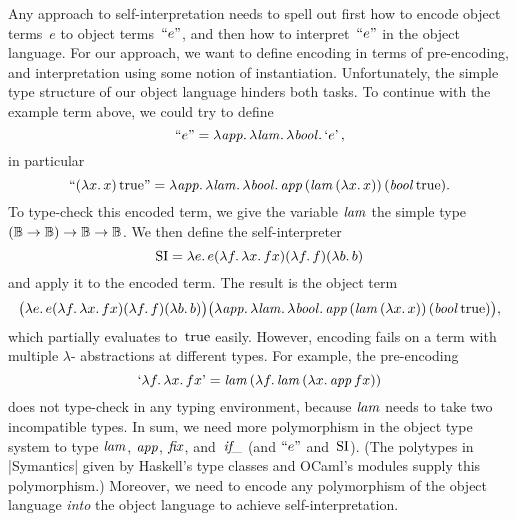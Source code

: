 Any approach to self\hyp interpretation needs to spell out first how to
encode object terms~$e$ to object terms~$\Encode{e}$, and then how to
interpret~$\Encode{e}$ in the object language.  For our approach, we
want to define encoding in terms of pre-encoding, and interpretation
using some notion of instantiation.  Unfortunately, the simple type
structure of our object language hinders both tasks.  To continue with
the example term above, we could try to define
\begin{equation*}
    \Encode{e} =
    \fun{\ident{app}} \fun{\ident{lam}} \fun{\ident{bool}} \encode{e},
\end{equation*}
in particular
\begin{equation*}
    \Encode{(\fun{x}x)\True} =
    \fun{\ident{app}} \fun{\ident{lam}} \fun{\ident{bool}}
    \ident{app} (\ident{lam} (\fun{x} x))\, (\ident{bool} \True).
\end{equation*}
To type-check this encoded term, we give the variable $\ident{lam}$ the
simple type $(\BB\to\BB)\to\BB\to\BB$.
We then define the self\hyp interpreter
\begin{equation*}
    \si = \fun{e} e
    (\fun{f} \fun{x} fx)
    (\fun{f} f)
    (\fun{b} b)
\end{equation*}
and apply it to the encoded term.  The result is the object term
\begin{equation*}
    \bigl(\fun{e} e (\fun{f} \fun{x} fx) (\fun{f} f) (\fun{b} b)\bigr)
    \bigl(
    \fun{\ident{app}} \fun{\ident{lam}} \fun{\ident{bool}}
    \ident{app} (\ident{lam} (\fun{x} x))\, (\ident{bool} \True)
    \bigr),
\end{equation*}
which partially evaluates to~$\True$ easily.
However, encoding fails on a term with multiple $\lambda$\hyp
abstractions at different types.  For example, the pre-encoding
\begin{equation*}
    \encode{\fun{f}\fun{x}fx}
    = \ident{lam} (\fun{f} \ident{lam} (\fun{x} \ident{app} f x))
\end{equation*}
does not type-check in any typing environment, because $\ident{lam}$ needs
to take two incompatible types.  In sum, we need more polymorphism in the
object type system to type $\ident{lam}$, $\ident{app}$, $\ident{fix}$,
and~$\ident{if\_}$ (and $\Encode{e}$ and~$\si$).
(The polytypes in |Symantics| given by Haskell's type classes and OCaml's
modules supply this polymorphism.)  Moreover, we need to encode any
polymorphism of the object language \emph{into} the object language to achieve
self\hyp interpretation.

